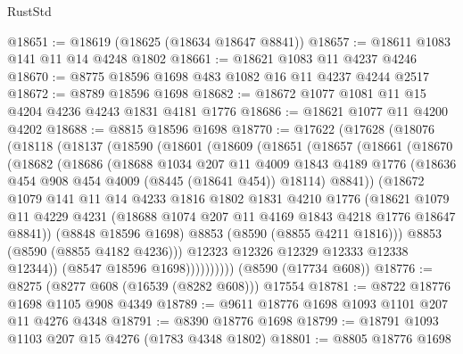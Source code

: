 \begin{lexlean}{RustStd}
\begin{coremodule}
@18651 := @18619 (@18625 (@18634 @18647 @8841))
@18657 := @18611 @1083 @141 @11 @14 @4248 @1802
@18661 := @18621 @1083 @11 @4237 @4246
@18670 := @8775 @18596 @1698 @483 @1082 @16 @11 @4237 @4244 @2517
@18672 := @8789 @18596 @1698
@18682 := @18672 @1077 @1081 @11 @15 @4204 @4236 @4243 @1831 @4181 @1776
@18686 := @18621 @1077 @11 @4200 @4202
@18688 := @8815 @18596 @1698
@18770 := @17622
    (@17628
      (@18076
        (@18118
          (@18137
            (@18590
              (@18601
                (@18609
                  (@18651
                    (@18657
                      (@18661
                        (@18670
                          (@18682
                            (@18686
                              (@18688
                                @1034
                                @207
                                @11
                                @4009
                                @1843
                                @4189
                                @1776
                                (@18636 @454 @908 @454 @4009 (@8445 (@18641 @454)) @18114)
                                @8841))
                            (@18672
                              @1079
                              @141
                              @11
                              @14
                              @4233
                              @1816
                              @1802
                              @1831
                              @4210
                              @1776
                              (@18621
                                @1079
                                @11
                                @4229
                                @4231
                                (@18688 @1074 @207 @11 @4169 @1843 @4218 @1776 @18647 @8841))
                              (@8848 @18596 @1698)
                              @8853
                              (@8590 (@8855 @4211 @1816)))
                            @8853
                            (@8590 (@8855 @4182 @4236)))
                          @12323
                          @12326
                          @12329
                          @12333
                          @12338
                          @12344))
                      (@8547 @18596 @1698))))))))))
    (@8590 (@17734 @608))
@18776 := @8275 (@8277 @608 (@16539 (@8282 @608))) @17554
@18781 := @8722 @18776 @1698 @1105 @908 @4349
@18789 := @9611 @18776 @1698 @1093 @1101 @207 @11 @4276 @4348
@18791 := @8390 @18776 @1698
@18799 := @18791 @1093 @1103 @207 @15 @4276 (@1783 @4348 @1802)
@18801 := @8805 @18776 @1698

\end{coremodule}
\end{lexlean}
